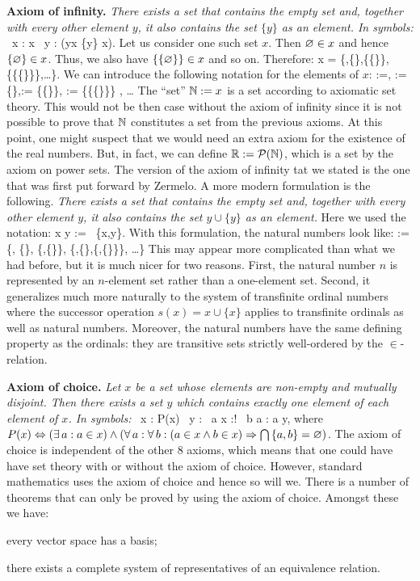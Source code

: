 \textbf{Axiom of infinity.} \emph{There exists a set that contains the empty set and,  together with every other element $y$, it also contains the set $\{y\}$ as an element. In symbols:}
\bse
\exists \, x : \vn \in x \land \forall \, y : (y\in x \imp \{y\} \in x).
\ese
Let us consider one such set $x$. Then $\varnothing \in x$ and hence $\{\varnothing\}\in x$. Thus, we also have $\{\{\varnothing\}\}\in x$ and so on. Therefore:
\bse
x = \{\vn,\{\vn\},\{\{\vn\}\},\{\{\{\vn\}\}\},\ldots\}.
\ese
We can introduce the following notation for the elements of $x$:
 :=\vn ,   := \{\vn\},:= \{\{\vn\}\}, := \{\{\{\vn\}\}\} , \quad \ldots
\ese
\bc
The ``set'' $\mathbb{N}:=x$ is a set according to axiomatic set theory.
\ec
This would not be then case without the axiom of infinity since it is not possible to prove that $\mathbb{N}$ constitutes a set from the previous axioms.
\br
At this point, one might suspect that we would need an extra axiom for the existence of the real numbers. But, in fact, we can define $\mathbb{R} := \mathcal{P}(\mathbb{N})$, which is a set by the axiom on power sets.
\er
\br
The version of the axiom of infinity tat we stated is the one that was first put forward by Zermelo. A more modern formulation is the following. \emph{There exists a set that contains the empty set and, together with every other element $y$, it also contains the set $y\cup\{y\}$ as an element.} Here we used the notation:
\bse
x \cup y := \bigcup \, \{x,y\}.
\ese
With this formulation, the natural numbers look like:
\bse
\N := \{\vn, \{\vn\}, \{\vn,\{\vn\}\}, \{\vn,\{\vn\},\{\vn,\{\vn\}\}\}, \ldots \}
\ese
This may appear more complicated than what we had before, but it is much nicer for two reasons.  First, the natural number $n$ is represented by an $n$-element set rather than a one-element set. Second, it generalizes much more naturally to the system of transfinite ordinal numbers where the successor operation $s(x)=x\cup\{x\}$ applies to transfinite ordinals as well as natural numbers. Moreover, the natural numbers have the same defining property as the ordinals: they are transitive sets strictly well-ordered by the $\in$-relation.
\er

\textbf{Axiom of choice.} \emph{Let $x$ be a set whose elements are non-empty and mutually disjoint. Then there exists a set $y$ which contains exactly one element of each element of $x$. In symbols:}
\bse
\forall \, x : P(x) \imp \exists \, y : \forall \, a \in x :\exists! \, b \in a : a \in y,
\ese
where $P(x) \Leftrightarrow (\exists \,a : a \in x) \land (\forall \, a : \forall \, b : (a\in x \land b \in x) \Rightarrow \bigcap \, \{a,b\} = \varnothing )$.
\br
The axiom of choice is independent of the other 8 axioms, which means that one could have have set theory with or without the axiom of choice. However, standard mathematics uses the axiom of choice and hence so will we. There is a number of theorems that can only be proved by using the axiom of choice. Amongst these we have:
\bit
\item every vector space has a basis;
\item there exists a complete system of representatives of an equivalence relation.
\eit
\er

